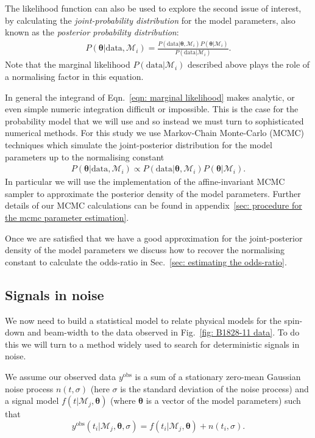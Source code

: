 \documentclass[../full_thesis/full_thesis.tex]{subfiles}
\newcommand{\M}{\mathcal{M}}
\newcommand{\data}{\textrm{data}}
\newcommand{\params}{\boldsymbol{\theta}}
\newcommand{\yobs}{y^{\textrm{obs}}}
\begin{document}
The likelihood function can also be used to explore the second issue of
interest, by calculating the \emph{joint-probability distribution} for the
model parameters, also known as the \emph{posterior probability distribution}:
\begin{align}
P(\params| \data, \M_{i}) =
\frac{P(\data| \params, \M_{i})P(\params | \M_{i})}
{P(\data| \M_{i})}.
\end{align}
Note that the marginal likelihood $P(\data| \M_{i})$ described above plays the
role of a normalising factor in this equation.

In general the integrand of Eqn.~\eqref{eqn: marginal likelihood} makes
analytic, or even simple numeric integration difficult or impossible. This is
the case for the probability model that we will use and so instead we must turn
to sophisticated numerical methods.  For this study we use Markov-Chain
Monte-Carlo (MCMC) techniques which simulate the joint-posterior distribution
for the model parameters up to the normalising constant
\begin{align}
P(\params | \data, \M_{i}) \propto
P(\data| \params, \M_{i})P(\params | \M_{i}).
\end{align}
In particular we will use the \citet{Foreman-Mackay2013} implementation of the
affine-invariant MCMC sampler \citep{Goodman2010} to approximate the posterior
density of the model parameters.  Further details of our MCMC calculations can
be found in appendix~\ref{sec: procedure for the mcmc parameter estimation}.

Once we are satisfied that we have a good approximation for the joint-posterior
density of the model parameters we discuss how to recover the normalising
constant to calculate the odds-ratio in Sec.~\ref{sec: estimating the
odds-ratio}.

\subsection{Signals in noise}
We now need to build a statistical model to relate physical models for the
spin-down and beam-width to the data observed in Fig.~\ref{fig: B1828-11 data}.
To do this we will turn to a method widely used to search for deterministic
signals in noise.

We assume our observed data $\yobs$ is a sum of a stationary zero-mean
Gaussian noise process
$n(t, \sigma)$ (here $\sigma$ is the  standard deviation of the noise process)
and a signal model $f(t| \M_{j}, \params)$ (where $\params$ is a vector of the
model parameters) such that
\begin{equation}
\yobs(t_i| \M_{j}, \params, \sigma) = f(t_i|\M_{j}, \params) + n(t_i, \sigma).
\label{eqn: yobs def}
\end{equation}
\end{document}

